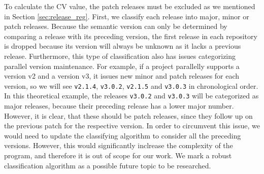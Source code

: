 To calculate the CV value, the patch releases must be excluded as we mentioned in Section \ref{sec:release_reg}. First, we classify each release into major, minor or patch releases. Because the semantic version can only be determined by comparing a release with its preceding version, the first release in each repository is dropped because its version will always be unknown as it lacks a previous release. Furthermore, this type of classification also has issues categorizing parallel version maintenance. For example, if a project parallelly supports a version v2 and a version v3, it issues new minor and patch releases for each version, so we will see \texttt{v2.1.4}, \texttt{v3.0.2}, \texttt{v2.1.5} and \texttt{v3.0.3} in chronological order. In this theoretical example, the releases \texttt{v3.0.2} and \texttt{v3.0.3} will be categorized as major releases, because their preceding release has a lower major number. However, it is clear, that these should be patch releases, since they follow up on the previous patch for the respective version. In order to circumvent this issue, we would need to update the classifying algorithm to consider all the preceding versions. However, this would significantly inclrease the complexity of the program, and therefore it is out of scope for our work. We mark a robust classification algorithm as a possible future topic to be researched.

